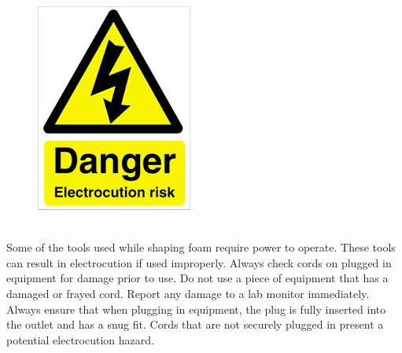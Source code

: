 \begin{framed}
\begin{figure}
\includegraphics[width=\linewidth]{images/electrocution_hazard.jpg}
\end{figure}
\ \\
Some of the tools used while shaping foam require power to operate. These tools can result in electrocution if used improperly. Always check cords on plugged in equipment for damage prior to use. Do not use a piece of equipment that has a damaged or frayed cord. Report any damage to a lab monitor immediately. Always ensure that when plugging in equipment, the plug is fully inserted into the outlet and has a snug fit. Cords that are not securely plugged in present a potential electrocution hazard.
\end{framed}

